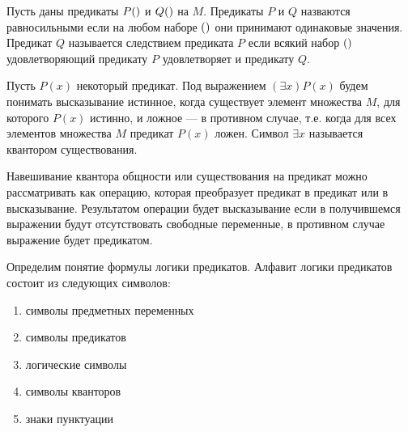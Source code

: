 \documentclass[letterpaper, 10pt]{article}
\theoremstyle{definition}
\begin{document}
	Пусть даны предикаты $P(\rseq x)$ и $Q(\rseq x)$ на $M$. Предикаты $P$ и $Q$
	назваются равносильными если на любом наборе $(\rseq a)$ они принимают
	одинаковые значения. Предикат $Q$ называется следствием предиката $P$ если
	всякий набор $(\rseq a)$ удовлетворяющий предикату $P$ удовлетворяет и
	предикату $Q$.

	Пусть $P(x)$ некоторый предикат. Под выражением $(\exists x )P(x)$ будем
	понимать высказывание истинное, когда существует элемент множества $M$, для
	которого $P(x)$ истинно, и ложное --- в противном случае, т.е. когда для
	всех элементов множества $M$ предикат $P(x)$ ложен. Символ $\exists x$
	называется квантором существования.

	Навешивание квантора общности или существования на предикат можно
	рассматривать как операцию, которая преобразует предикат в предикат или в
	высказывание. Результатом операции будет высказывание если в получившемся
	выражении будут отсутствовать свободные переменные, в противном случае
	выражение будет предикатом.

	Определим понятие формулы логики предикатов.
	Алфавит логики предикатов состоит из следующих символов:
	\begin{enumerate}
		\item символы предметных переменных
		\item символы предикатов
		\item логические символы
		\item символы кванторов
		\item знаки пунктуации
	\end{enumerate}
\end{document}
